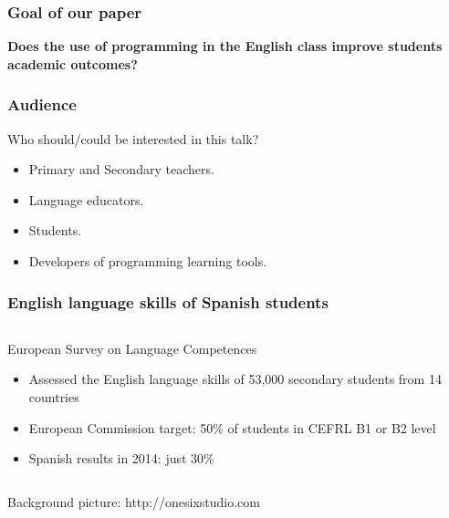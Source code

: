 \documentclass{beamer}
\begin{document}

\begin{frame}
\frametitle{Goal of our paper}

\begin{center}
\Huge {\bf Does the use of programming in the English class improve students academic outcomes?}
\end{center}

\end{frame}



\begin{frame}
\frametitle{Audience}

Who should/could be interested in this talk?

\begin{itemize}
  \item Primary and Secondary teachers.
  \item Language educators.
  \item Students.
  \item Developers of programming learning tools.
\end{itemize} 

\end{frame}

\usebackgroundtemplate{}
\begin{frame}
\frametitle{English language skills of Spanish students}


  \begin{columns}[T]
    \begin{column}{1\textwidth}
     \begin{block}{European Survey on Language Competences}
\begin{itemize}
  \item Assessed the English language skills of 53,000 secondary students from 14 countries
  \item European Commission target: 50\% of students in CEFRL B1 or B2 level
  \item Spanish results in 2014: just 30\%
\end{itemize}
    \end{block}
    \end{column}
    
  \end{columns}
\hfill{\Tiny Background picture: http://onesixstudio.com }
\end{frame}
\end{document}
